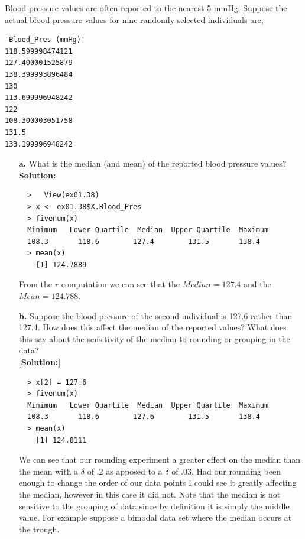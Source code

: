 \documentclass[12pt]{article}
\makeatletter
\theoremstyle{homework}
\newenvironment{exercise}[1]
{\def\@currentlabel{#1}\exercisecore}
{\endexercisecore}
\makeatother
\begin{document}
\begin{exercise}{1.38} Blood pressure values are often reported to the nearest 5 mmHg. Suppose the actual blood pressure values for nine randomly selected individuals are,

\begin{lstlisting}
'Blood_Pres (mmHg)'
118.599998474121
127.400001525879
138.399993896484
130
113.699996948242
122
108.300003051758
131.5
133.199996948242
\end{lstlisting}
\begin{enumerate}
  \item[\textbf{a.}] What is the median (and mean) of the reported blood pressure values?\\
  
  \textbf{Solution:}
  \begin{lstlisting}
  >   View(ex01.38)
  > x <- ex01.38$X.Blood_Pres
  > fivenum(x)
  Minimum   Lower Quartile  Median  Upper Quartile  Maximum 
  108.3       118.6        127.4        131.5       138.4 
  > mean(x)
    [1] 124.7889
\end{lstlisting}
From the $r$ computation we can see that the $Median = 127.4$ and the $Mean = 124.788$. 
  \vspace{.5in}

  
  
  
  \item[\textbf{b.}]Suppose the blood pressure of the second individual is 127.6 rather than 127.4. How does this affect the median of the reported values?
  What does this say about the sensitivity of the median to rounding or grouping in the data?\\
  
  [\textbf{Solution:}]
  
  \begin{lstlisting}
  > x[2] = 127.6
  > fivenum(x)
  Minimum   Lower Quartile  Median  Upper Quartile  Maximum 
  108.3       118.6        127.6        131.5       138.4 
  > mean(x)
    [1] 124.8111
  \end{lstlisting}
  We can see that our rounding experiment a greater effect on the median than the mean with a $\delta$ of .2 as apposed to a $\delta$ of .03. 
  Had our rounding been enough to change the order of our data points I could see it greatly affecting the median, however in this case it did not. Note 
  that the median is not sensitive to the grouping of data since by definition it is simply the middle value. For example suppose a bimodal data set where the median occurs at the trough.
\end{enumerate}

\end{exercise}
\vspace{1in}
\end{document}

